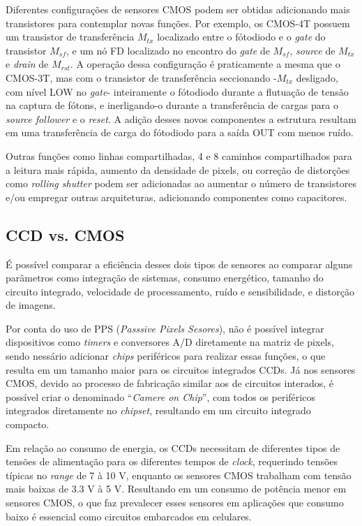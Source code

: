 \documentclass[10pt,a4paper,twocolumn]{article}
\begin{document}
	Diferentes configurações de sensores CMOS podem ser obtidas adicionando mais transistores para contemplar novas funções. Por exemplo, os CMOS-4T possuem um transistor de transferência $M_{tx}$ localizado entre o fótodiodo e o \textit{gate} do transistor $M_{sf}$, e um nó FD localizado no encontro do \textit{gate} de $M_{sf}$, \textit{source} de $M_{tx}$ e \textit{drain} de $M_{rst}$. A operação dessa configuração é praticamente a mesma que o CMOS-3T, mas com o transistor de transferência seccionando -$M_{tx}$ desligado, com nível LOW no \textit{gate}- inteiramente o fótodiodo durante a flutuação de tensão na captura de fótons, e inerligando-o durante a transferência de cargas para o \textit{source follower} e o \textit{reset}. A adição desses novos componentes a estrutura resultam em uma transferência de carga do fótodiodo para a saída OUT com menos ruído.
	
	Outras funções como linhas compartilhadas, 4 e 8 caminhos compartilhados para a leitura mais rápida, aumento da densidade de pixels, ou correção de distorções como \textit{rolling shutter} podem ser adicionadas ao aumentar o número de transistores e/ou empregar outras arquiteturas, adicionando componentes como capacitores.
	
	\subsection*{CCD vs. CMOS}
	É possível comparar a eficiência desses dois tipos de sensores ao comparar alguns parâmetros como integração de sistemas, consumo energético, tamanho do circuito integrado, velocidade de processamento, ruído e sensibilidade, e distorção de imagens.
	
	Por conta do uso de PPS (\textit{Passsive Pixels Sesores}), não é possível integrar dispositivos como \textit{timers} e conversores A/D diretamente na matriz de pixels, sendo nessário adicionar \textit{chips} periféricos para realizar essas funções, o que resulta em um tamanho maior para os circuitos integrados CCDs. Já nos sensores CMOS, devido ao processo de fabricação similar aos de circuitos interados, é possível criar o denominado ``\textit{Camere on Chip}'', com todos os periféricos integrados diretamente no \textit{chipset}, resultando em um circuito integrado compacto.
	
	Em relação ao consumo de energia, os CCDs necessitam de diferentes tipos de tensões de alimentação para os diferentes tempos de \textit{clock}, requerindo tensões típicas no \textit{range} de 7 à 10 V, enquanto os sensores CMOS trabalham com tensão mais baixas de 3.3 V à 5 V. Resultando em um consumo de potência menor em sensores CMOS, o que faz prevalecer esses sensores em aplicações que consumo baixo é essencial como circuitos embarcados em celulares.
	
\end{document}
